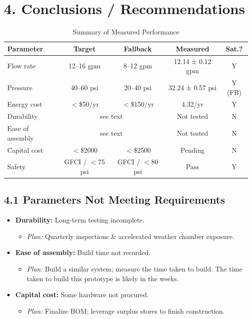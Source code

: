 \documentclass[12pt]{article}
\begin{document}
\newpage\section*{4. Conclusions / Recommendations}
\begin{table}[h]
  \centering
  \caption{Summary of Measured Performance}
  \begin{tabular}{@{}lcccc@{}}
    \toprule
    Parameter      & Target           & Fallback        & Measured             & Sat.? \\
    \midrule
    Flow rate      & 12--16 gpm       & 8--12 gpm       & 12.14 ± 0.12 gpm       & Y     \\
    Pressure       & 40--60 psi       & 20--40 psi      & 32.24 ± 0.57 psi     & Y (FB)
    \\
    Energy cost    & $<$\$50/yr         & $<$\$150/yr       & 4.32/yr              & Y     \\
    Durability     & \multicolumn{2}{c}{see text} & Not tested            & N     \\
    Ease of assembly & \multicolumn{2}{c}{see text} & Not tested            & N     \\
    Capital cost   & $<$\$2000          & $<$\$2500         & Pending               & N     \\
    Safety         & GFCI / $<$75 psi   & GFCI / $<$80 psi  & Pass                  & Y     \\
    \bottomrule
  \end{tabular}
\end{table}

\subsection*{4.1 Parameters Not Meeting Requirements}
\begin{itemize}[leftmargin=*]
  \item \textbf{Durability:} Long-term testing incomplete.
    \begin{itemize}[leftmargin=*]
      \item \emph{Plan:} Quarterly inspections \& accelerated weather chamber exposure.
    \end{itemize}
  \item \textbf{Ease of assembly:} Build time not recorded.
    \begin{itemize}[leftmargin=*]
      \item \emph{Plan:} Build a similar system; measure the time taken to build. The time taken to build this prototype is likely in the weeks.
    \end{itemize}
  \item \textbf{Capital cost:} Some hardware not procured.
    \begin{itemize}[leftmargin=*]
      \item \emph{Plan:} Finalize BOM; leverage surplus stores to finish construction.
    \end{itemize}
\end{itemize}
\end{document}
